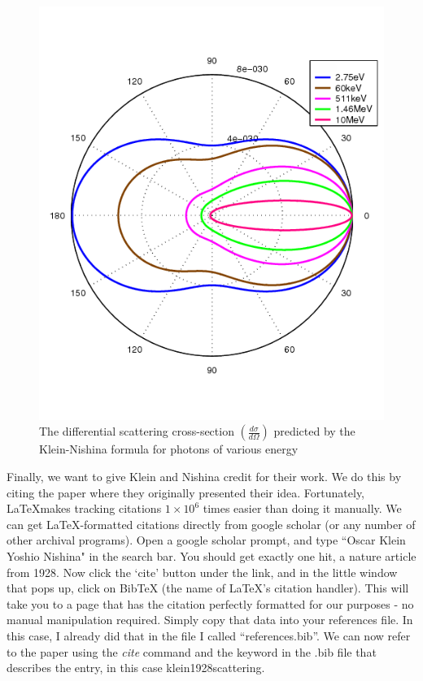 \documentclass[11pt]{article}
\begin{document}
\begin{figure}[htbp]
  \begin{center}
  \includegraphics[width=0.5\linewidth]{Klein-Nishina_distribution.png}
  \end{center}
  \caption{The differential scattering cross-section 
           $(\frac{d\sigma}{d\Omega})$ predicted by the Klein-Nishina formula
           for photons of various energy}
  \label{fig:kn_plot}
\end{figure}

Finally, we want to give Klein and Nishina credit for their work.
We do this by citing the paper where they originally presented their idea.
Fortunately, \LaTeX makes tracking citations $1\times10^{6}$ times easier than
doing it manually.
We can get \LaTeX-formatted citations directly from google scholar (or any
number of other archival programs).
Open a google scholar prompt, and type ``Oscar Klein Yoshio Nishina" in the 
search bar. 
You should get exactly one hit, a nature article from 1928.
Now click the `cite' button under the link, and in the little window that pops
up, click on BibTeX (the name of \LaTeX's citation handler).
This will take you to a page that has the citation perfectly formatted for our
purposes - no manual manipulation required.
Simply copy that data into your references file. In this case, I already did
that in the file I called ``references.bib''.
We can now refer to the paper using the \emph{cite} command and the keyword in
the .bib file that describes the entry, in this case klein1928scattering.
\end{document}
